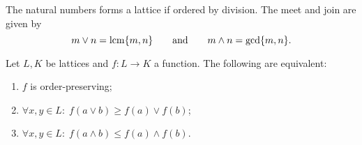 \begin{lemma}
The natural numbers forms a lattice if ordered by division. The meet and join are given by
\[ m\vee n = \operatorname{lcm}\{m,n\} \qquad \text{and}\qquad m\wedge n = \gcd\{m,n\}. \]
\end{lemma}

\begin{lemma}
Let $L,K$ be lattices and $f:L\to K$ a function. The following are equivalent:
\begin{enumerate}
\item $f$ is order-preserving;
\item $\forall x,y\in L:\; f(a\vee b)\geq f(a)\vee f(b)$;
\item $\forall x,y\in L:\; f(a\wedge b)\leq f(a)\wedge f(b)$.
\end{enumerate}
\end{lemma}

